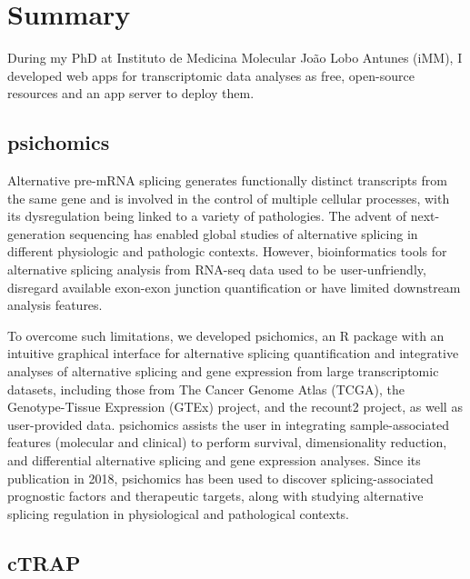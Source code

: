 \chapter*{Summary}

During my PhD at Instituto de Medicina Molecular João Lobo Antunes (iMM), I developed web apps for transcriptomic data analyses as free, open-source resources and an app server to deploy them.

\section*{psichomics}

Alternative pre-mRNA splicing generates functionally distinct transcripts from the same gene and is involved in the control of multiple cellular processes, with its dysregulation being linked to a variety of pathologies. The advent of next-generation sequencing has enabled global studies of alternative splicing in different physiologic and pathologic contexts. However, bioinformatics tools for alternative splicing analysis from RNA-seq data used to be user-unfriendly, disregard available exon-exon junction quantification or have limited downstream analysis features.

To overcome such limitations, we developed psichomics, an R package with an intuitive graphical interface for alternative splicing quantification and integrative analyses of alternative splicing and gene expression from large transcriptomic datasets, including those from The Cancer Genome Atlas (TCGA), the Genotype-Tissue Expression (GTEx) project, and the recount2 project, as well as user-provided data. psichomics assists the user in integrating sample-associated features (molecular and clinical) to perform survival, dimensionality reduction, and differential alternative splicing and gene expression analyses. Since its publication in 2018, psichomics has been used to discover splicing-associated prognostic factors and therapeutic targets, along with studying alternative splicing regulation in physiological and pathological contexts.

\section*{cTRAP}

